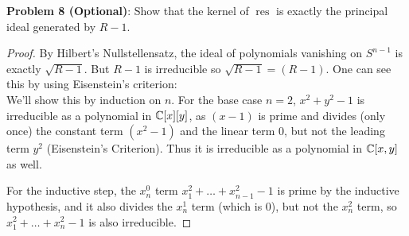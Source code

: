 \documentclass{amsart}
\DeclareMathOperator{\res}{res}
\begin{document}
 \newpage
 
\noindent \textbf{Problem 8 (Optional)}: Show that the kernel of $\res$ is exactly the principal ideal generated by $R-1$.

\begin{proof}
	By Hilbert's Nullstellensatz, the ideal of polynomials vanishing on $S^{n-1}$ is exactly $\sqrt{R-1}$. But $R-1$ is irreducible so $\sqrt{R-1}=(R-1)$. One can see this by using Eisenstein's criterion:\\
	
	We'll show this by induction on $n$. For the base case $n=2$, $x^2+y^2 - 1$ is irreducible as a polynomial in $\mathbb{C}[x][y]$, as $(x-1)$ is prime and divides (only once) the constant term $(x^2-1)$ and the linear term $0$, but not the leading term $y^2$ (Eisenstein's Criterion). Thus it is irreducible as a polynomial in $\mathbb{C}[x,y]$ as well.
	
	For the inductive step, the $x_n^0$ term $x_1^2+\dots+x_{n-1}^2-1$ is prime by the inductive hypothesis, and it also divides the $x_n^1$ term (which is 0), but not the $x_n^2$ term, so $x_1^2+\dots+x_n^2-1$ is also irreducible.
\end{proof} 
		 
\end{document}
